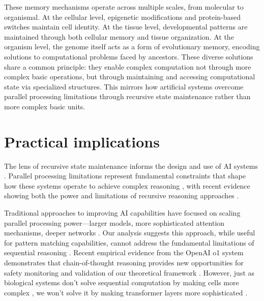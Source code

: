 \documentclass[12pt]{article}
\begin{document}
These memory mechanisms operate across multiple scales, from molecular to organismal.
At the cellular level, epigenetic modifications and protein-based switches maintain cell identity.
At the tissue level, developmental patterns are maintained through both cellular memory and tissue organization.
At the organism level, the genome itself acts as a form of evolutionary memory, encoding solutions to computational problems faced by ancestors.
These diverse solutions share a common principle: they enable complex computation not through more complex basic operations, but through maintaining and accessing computational state via specialized structures.
This mirrors how artificial systems overcome parallel processing limitations through recursive state maintenance rather than more complex basic units.

\section{Practical implications}

The lens of recursive state maintenance informs the design and use of AI systems \cite{dickson2024trust,ahn2024recursive,openai2024o1}.
Parallel processing limitations represent fundamental constraints that shape how these systems operate to achieve complex reasoning \cite{merrill2023parallelism}, with recent evidence showing both the power and limitations of recursive reasoning approaches \cite{liu2024mind}.

Traditional approaches to improving AI capabilities have focused on scaling parallel processing power---larger models, more sophisticated attention mechanisms, deeper networks \cite{shallue2019measuring}.
Our analysis suggests this approach, while useful for pattern matching capabilities, cannot address the fundamental limitations of sequential reasoning \cite{peng2024limitations}.
Recent empirical evidence from the OpenAI o1 system demonstrates that chain-of-thought reasoning provides new opportunities for safety monitoring and validation of our theoretical framework \cite{openai2024o1}.
However, just as biological systems don't solve sequential computation by making cells more complex \cite{wang2023parallel}, we won't solve it by making transformer layers more sophisticated \cite{zhao2024epha}.
\end{document}
